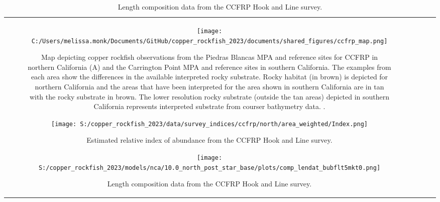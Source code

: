 \documentclass[11pt,
  letterpaper,
]{article}
\begin{document}
\begin{longtable}[t]{c>{\centering\arraybackslash}p{2cm}>{\centering\arraybackslash}p{2cm}>{\centering\arraybackslash}p{2cm}}
\pagebreak

\begin{figure}
{\centering
\texttt{[image: C:/Users/melissa.monk/Documents/GitHub/copper\_rockfish\_2023/documents/shared\_figures/ccfrp\_map.png]}
}
\caption{Map depicting copper rockfish observations from the Piedras Blancas MPA and reference sites for CCFRP in northern California (A) and the Carrington Point MPA and reference sites in southern California. The examples from each area show the differences in the available interpreted rocky substrate. Rocky habitat (in brown) is depicted for northern California and the areas that have been interpreted for the area shown in southern California are in tan with the rocky substrate in brown.  The lower resolution rocky substrate (outside the tan areas) depicted in southern California represents interpreted substrate from courser bathymetry data. .\label{fig:ccfrp-map}}
\end{figure}

\begin{figure}
{\centering
\texttt{[image: S:/copper\_rockfish\_2023/data/survey\_indices/ccfrp/north/area\_weighted/Index.png]}
}
\caption{Estimated relative index of abundance from the CCFRP Hook and Line survey.\label{fig:ccfrp-index-main}}
\end{figure}

\pagebreak

\begin{figure}
{\centering
\texttt{[image: S:/copper\_rockfish\_2023/models/nca/10.0\_north\_post\_star\_base/plots/comp\_lendat\_bubflt5mkt0.png]}
}
\caption{Length composition data from the CCFRP Hook and Line survey.\label{fig:ccfrp-len-data}}
\end{figure}


\end{longtable}
\end{document}
